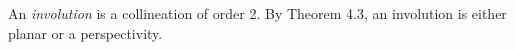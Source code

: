 An \textit{involution} is a collineation of order 2. By Theorem 4.3, an involution is either planar or a perspectivity.
